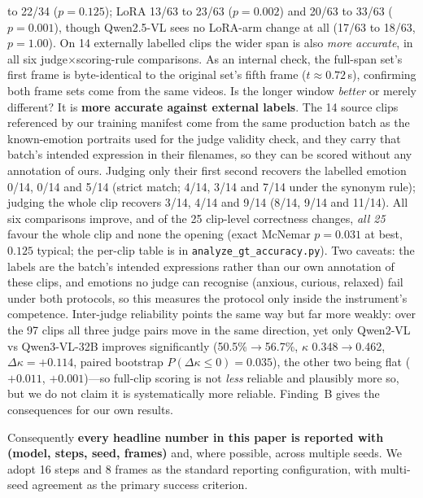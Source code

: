 \documentclass{article}
\begin{document}
\begin{itemize}
to 22/34 ($p{=}0.125$); LoRA 13/63 to 23/63 ($p{=}0.002$) and 20/63 to 33/63 ($p{=}0.001$), though
Qwen2.5-VL sees no LoRA-arm change at all (17/63 to 18/63, $p{=}1.00$). On 14 externally labelled clips the
wider span is also \emph{more accurate}, in all six judge$\times$scoring-rule comparisons. As an internal check, the full-span set's
first frame is byte-identical to the original set's fifth frame ($t\approx0.72$\,s), confirming both
frame sets come from the same videos. Is the longer window \emph{better} or merely different? It is
\textbf{more accurate against external labels}. The 14 source clips referenced by our training manifest
come from the same production batch as the known-emotion portraits used for the judge validity check, and
they carry that batch's intended expression in their filenames, so they can be scored without any
annotation of ours. Judging only their first second recovers the labelled emotion 0/14, 0/14 and 5/14
(strict match; 4/14, 3/14 and 7/14 under the synonym rule); judging the whole clip recovers 3/14, 4/14 and
9/14 (8/14, 9/14 and 11/14). All six comparisons improve, and of the 25 clip-level correctness changes,
\emph{all 25} favour the whole clip and none the opening (exact McNemar $p{=}0.031$ at best, $0.125$
typical; the per-clip table is in \texttt{analyze\_gt\_accuracy.py}). Two caveats: the labels are the
batch's intended expressions rather than our own annotation of these clips, and emotions no judge can
recognise (anxious, curious, relaxed) fail under both protocols, so this measures the protocol only inside
the instrument's competence. Inter-judge reliability points the same way but far more weakly: over the 97
clips all three judge pairs move in the same direction, yet only Qwen2-VL vs Qwen3-VL-32B improves
significantly (50.5\%$\rightarrow$56.7\%, $\kappa$ 0.348$\rightarrow$0.462,
$\Delta\kappa{=}{+}0.114$, paired bootstrap $P(\Delta\kappa{\le}0){=}0.035$), the other two being flat
($+0.011$, $+0.001$)---so full-clip scoring is not \emph{less} reliable and plausibly more so, but we do
not claim it is systematically more reliable. Finding~B gives the consequences for our own
results.
\end{itemize}
Consequently \textbf{every headline number in this paper is reported with (model, steps, seed,
frames)} and, where possible, across multiple seeds. We adopt 16 steps and 8 frames as the
standard reporting configuration, with multi-seed agreement as the primary success criterion.
\end{document}

